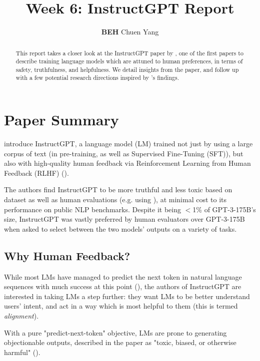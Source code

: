 \documentclass{article} %
\title{Week 6: InstructGPT Report}
\author{\textbf{BEH} Chuen Yang}
\begin{document}
\ifcolmsubmission
\linenumbers
\fi

\maketitle

\begin{abstract}
    This report takes a closer look at the InstructGPT paper by \cite{InstructGPT-2022},
    one of the first papers to describe training language models which
    are attuned to human preferences, in terms of safety, truthfulness, and helpfulness.
    We detail insights from the paper, and follow up with a few potential 
    research directions inspired by \cite{InstructGPT-2022}'s findings.
\end{abstract}

\section{Paper Summary}
\cite{InstructGPT-2022} introduce InstructGPT, a language model (LM) trained not just
by using a large corpus of text (in pre-training, as well as Supervised Fine-Tuning (SFT)), 
but also with high-quality human feedback via Reinforcement Learning from Human Feedback (RLHF) 
(\cite{Christiano-et-al-2017, Stiennon-et-al-2020}).

The authors find InstructGPT to be more truthful and less toxic
based on dataset as well as human evaluations (e.g. using \cite{Gehman-et-al-2020}),
at minimal cost to its performance on public NLP benchmarks.
Despite it being $<$1\% of GPT-3-175B's size, InstructGPT
was vastly preferred by human evaluators over GPT-3-175B 
when asked to select between the two models' outputs
on a variety of tasks.

\subsection{Why Human Feedback?}
While most LMs have managed to predict the next token in natural language sequences
with much success at this point (\cite{Radford-et-al-2019, Brown-et-al-2020}), 
the authors of InstructGPT are interested in taking LMs a step further: 
they want LMs to be better understand users' intent, and act in a way which is
most helpful to them (this is termed \textit{alignment}).

With a pure "predict-next-token" objective, LMs are prone
to generating objectionable outputs, described in the paper as 
"toxic, biased, or otherwise harmful" (\cite{InstructGPT-2022}).
\end{document}
